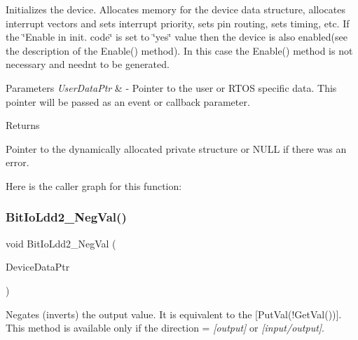 Initializes the device. Allocates memory for the device data structure, allocates interrupt vectors and sets interrupt priority, sets pin routing, sets timing, etc. If the \char`\"{}\+Enable
    in init. code\char`\"{} is set to \char`\"{}yes\char`\"{} value then the device is also enabled(see the description of the Enable() method). In this case the Enable() method is not necessary and needn\textquotesingle{}t to be generated. 


\begin{DoxyParams}{Parameters}
{\em User\+Data\+Ptr} & -\/ Pointer to the user or R\+T\+OS specific data. This pointer will be passed as an event or callback parameter. \\
\hline
\end{DoxyParams}
\begin{DoxyReturn}{Returns}

\begin{DoxyItemize}
\item Pointer to the dynamically allocated private structure or N\+U\+LL if there was an error. 
\end{DoxyItemize}
\end{DoxyReturn}
Here is the caller graph for this function\+:
\mbox{\label{group___bit_io_ldd2__module_ga90ce20ceb13c4409d5526b15f0054e1a}} 
\subsubsection{\texorpdfstring{Bit\+Io\+Ldd2\+\_\+\+Neg\+Val()}{BitIoLdd2\_NegVal()}}
{\footnotesize\ttfamily void Bit\+Io\+Ldd2\+\_\+\+Neg\+Val (\begin{DoxyParamCaption}\item[{\hyperlink{group___p_e___types__module_gac5cf1362f1f0e3a2ce71b1bf2276d091}{L\+D\+D\+\_\+\+T\+Device\+Data} $\ast$}]{Device\+Data\+Ptr }\end{DoxyParamCaption})}



Negates (inverts) the output value. It is equivalent to the \mbox{[}Put\+Val(!\+Get\+Val())\mbox{]}. This method is available only if the direction = {\itshape \mbox{[}output\mbox{]}} or {\itshape \mbox{[}input/output\mbox{]}}. 


